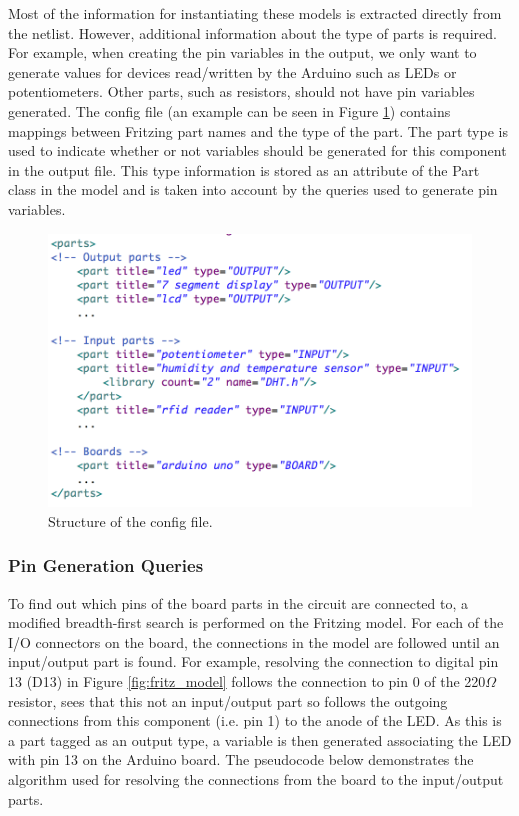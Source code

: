 \documentclass{UoYCSproject}
\begin{document}
Most of the information for instantiating these models is extracted directly from the netlist. However, additional information about the type of parts is required. For example, when creating the pin variables in the output, we only want to generate values for devices read/written by the Arduino such as LEDs or potentiometers. Other parts, such as resistors, should not have pin variables generated. The config file (an example can be seen in Figure \ref{fig:config}) contains mappings between Fritzing part names and the type of the part. The part type is used to indicate whether or not variables should be generated for this component in the output file. This type information is stored as an attribute of the Part class in the model and is taken into account by the queries used to generate pin variables.

\begin{figure}[h!]
  \centering
  \includegraphics[width=0.6\linewidth]{graphics/config_file.png}
  \caption{Structure of the config file.}
  \label{fig:config}
\end{figure}

\subsubsection{Pin Generation Queries}
To find out which pins of the board parts in the circuit are connected to, a modified breadth-first search is performed on the Fritzing model. For each of the I/O connectors on the board, the connections in the model are followed until an input/output part is found. For example, resolving the connection to digital pin 13 (D13) in Figure \ref{fig:fritz_model} follows the connection to pin 0 of the 220$\Omega$ resistor, sees that this not an input/output part so follows the outgoing connections from this component (i.e. pin 1) to the anode of the LED. As this is a part tagged as an output type, a variable is then generated associating the LED with pin 13 on the Arduino board. The pseudocode below demonstrates the algorithm used for resolving the connections from the board to the input/output parts.
\end{document}
